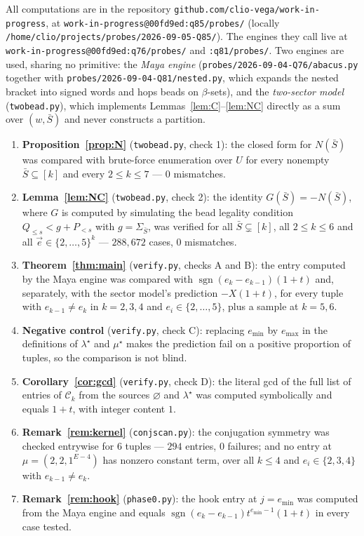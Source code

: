 \documentclass[11pt]{article}
\theoremstyle{definition}
\newcommand{\Ck}{\mathcal{C}}
\newcommand{\vac}{\varnothing}
\DeclareMathOperator{\sgn}{sgn}
\begin{document}
All computations are in the repository
\texttt{github.com/clio-vega/work-in-progress}, at
\texttt{work-in-progress@00fd9ed:q85/probes/} (locally
\texttt{/home/clio/projects/probes/2026-09-05-Q85/}).  The engines they call live at
\texttt{work-in-progress@00fd9ed:q76/probes/} and \texttt{:q81/probes/}.
Two engines are used, sharing
no primitive: the \emph{Maya engine} (\texttt{probes/2026-09-04-Q76/abacus.py} together
with \texttt{probes/2026-09-04-Q81/nested.py}, which expands the nested bracket into
signed words and hops beads on $\beta$-sets), and the \emph{two-sector model}
(\texttt{twobead.py}), which implements Lemmas~\ref{lem:C}--\ref{lem:NC} directly as a
sum over $(w,\bar S)$ and never constructs a partition.

\begin{enumerate}
\item \textbf{Proposition~\ref{prop:N}} (\texttt{twobead.py}, check 1): the closed form for
$N(\bar S)$ was compared with brute-force enumeration over $U$ for every nonempty
$\bar S\subseteq[k]$ and every $2\le k\le7$ --- $0$ mismatches.
\item \textbf{Lemma~\ref{lem:NC}} (\texttt{twobead.py}, check 2): the identity
$G(\bar S)=-N(\bar S)$, where $G$ is computed by simulating the bead legality condition
$Q_{\le s}<g+P_{<s}$ with $g=\Sigma_{\bar S}$, was verified for all
$\bar S\subsetneq[k]$, all $2\le k\le6$ and all $\vec e\in\{2,\dots,5\}^k$ ---
$288{,}672$ cases, $0$ mismatches.
\item \textbf{Theorem~\ref{thm:main}} (\texttt{verify.py}, checks A and B): the entry
computed by the Maya engine was compared with $\sgn(e_k-e_{k-1})(1+t)$ and, separately,
with the sector model's prediction $-X(1+t)$, for every tuple with $e_{k-1}\ne e_k$ in
$k=2,3,4$ and $e_i\in\{2,\dots,5\}$, plus a sample at $k=5,6$.
\item \textbf{Negative control} (\texttt{verify.py}, check C): replacing $e_{\min}$ by
$e_{\max}$ in the definitions of $\lambda^\star$ and $\mu^\star$ makes the prediction
fail on a positive proportion of tuples, so the comparison is not blind.
\item \textbf{Corollary~\ref{cor:gcd}} (\texttt{verify.py}, check D): the literal gcd of
the full list of entries of $\Ck_k$ from the sources $\vac$ and $\lambda^\star$ was
computed symbolically and equals $1+t$, with integer content $1$.
\item \textbf{Remark~\ref{rem:kernel}} (\texttt{conjscan.py}): the conjugation symmetry was
checked entrywise for $6$ tuples --- $294$ entries, $0$ failures; and no entry at
$\mu=(2,2,1^{E-4})$ has nonzero constant term, over all $k\le4$ and $e_i\in\{2,3,4\}$ with
$e_{k-1}\ne e_k$.
\item \textbf{Remark~\ref{rem:hook}} (\texttt{phase0.py}): the hook entry at
$j=e_{\min}$ was computed from the Maya engine and equals
$\sgn(e_k-e_{k-1})t^{e_{\min}-1}(1+t)$ in every case tested.
\end{enumerate}
\end{document}
